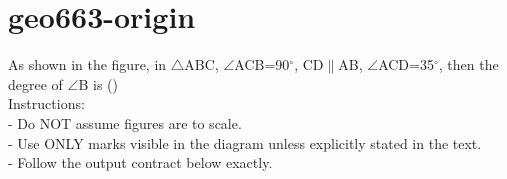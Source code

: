 \documentclass[12pt]{article}
\begin{document}
\section*{geo663-origin}
\noindent\begin{minipage}{\textwidth}
\setlength{\parskip}{4pt}
As shown in the figure, in \ensuremath{\triangle }ABC, \ensuremath{\angle }ACB=90\ensuremath{^\circ}, CD\ensuremath{\parallel }AB, \ensuremath{\angle }ACD=35\ensuremath{^\circ}, then the degree of \ensuremath{\angle }B is ()\\
Instructions:\\
- Do NOT assume figures are to scale.\\
- Use ONLY marks visible in the diagram unless explicitly stated in the text.\\
- Follow the output contract below exactly.\\
\end{minipage}
\end{document}
